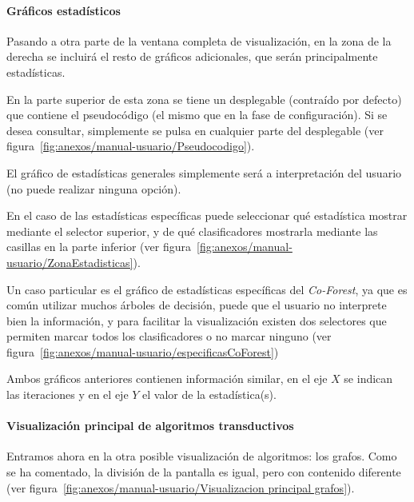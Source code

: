 
\paragraph{Gráficos estadísticos} Pasando a otra parte de la ventana completa de visualización, en la zona de la derecha se incluirá el resto de gráficos
adicionales, que serán principalmente estadísticas.


En la parte superior de esta zona se tiene un desplegable (contraído por defecto) que contiene el pseudocódigo (el mismo que en la fase de configuración). Si se desea consultar, simplemente se pulsa en cualquier parte del desplegable (ver figura~\ref{fig:anexos/manual-usuario/Pseudocodigo}).


El gráfico de estadísticas generales simplemente será a interpretación del
usuario (no puede realizar ninguna opción). 

En el caso de las estadísticas específicas puede seleccionar qué estadística mostrar mediante el selector superior, y de qué clasificadores mostrarla mediante las casillas en la parte inferior (ver figura~\ref{fig:anexos/manual-usuario/ZonaEstadisticas}).

Un caso particular es el gráfico de estadísticas específicas del \textit{Co-Forest}, ya que es común utilizar muchos árboles de decisión, puede que el usuario no interprete bien la información, y para facilitar la visualización existen dos selectores que permiten marcar todos los clasificadores o no marcar ninguno (ver figura~\ref{fig:anexos/manual-usuario/especificasCoForest})


Ambos gráficos anteriores contienen información similar, en el eje $X$ se indican las iteraciones y en el eje $Y$ el valor de la estadística(s).

\paragraph{Visualización principal de algoritmos transductivos} Entramos ahora en la otra posible visualización de algoritmos: los grafos. Como se ha comentado, la división de la pantalla es igual, pero con contenido diferente (ver figura~\ref{fig:anexos/manual-usuario/Visualizacion principal grafos}).


